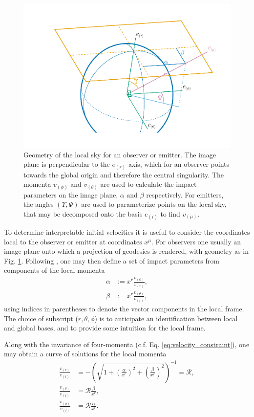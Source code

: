 \begin{figure}
    \centering
    \includegraphics[width=0.99\linewidth]{figures/skycoords.pdf}
    \caption{Geometry of the local sky for an observer or emitter. The image plane is perpendicular to the $e_{(r)}$ axis, which for an observer points towards the global origin and therefore the central singularity. The momenta $v_{(\phi)}$ and $v_{(\theta)}$ are used to calculate the impact parameters on the image plane, $\alpha$ and $\beta$ respectively. For emitters, the angles $(\Upsilon, \Psi)$ are used to parameterize points on the local sky, that may be decomposed onto the basis $e_{(i)}$ to find $v_{(\mu)}$.}
    \label{fig:observer-coordinates}
\end{figure}

To determine interpretable initial velocities it is useful to consider the coordinates local to the observer or emitter at coordinates $x^\mu$. For observers one usually an image plane onto which a projection of geodesics is rendered, with geometry as in Fig. \ref{fig:observer-coordinates}. Following \cite{cunningham_optical_1973}, one may then define a set of impact parameters from components of the local momenta
\begin{align}
    \alpha &:=  x^r \frac{v_{(\phi)}}{v_{(r)}}, \\
    \beta &:= x^r \frac{v_{(\theta)}}{v_{(r)}},
\end{align}
using indices in parentheses to denote the vector components in the local frame. The choice of subscript ($r, \theta, \phi$) is to anticipate an identification between local and global bases, and to provide some intuition for the local frame.

Along with the invariance of four-momenta (c.f. Eq. \eqref{eq:velocity_constraint}), one may obtain a curve of solutions for the local momenta
\begin{align}
    \frac{v_{(r)}}{v_{(t)}} &= -\left( \sqrt{1 + \left(\frac{\alpha}{x^r}\right)^2 + \left(\frac{\beta}{x^r}\right)^2} \right)^{-1} = \mathscr{R}, \\
    \frac{v_{(\theta)}}{v_{(t)}} &= \mathscr{R} \frac{\beta}{x^r}, \\
    \frac{v_{(\phi)}}{v_{(t)}} &= \mathscr{R} \frac{\alpha}{x^r}.
\end{align}

